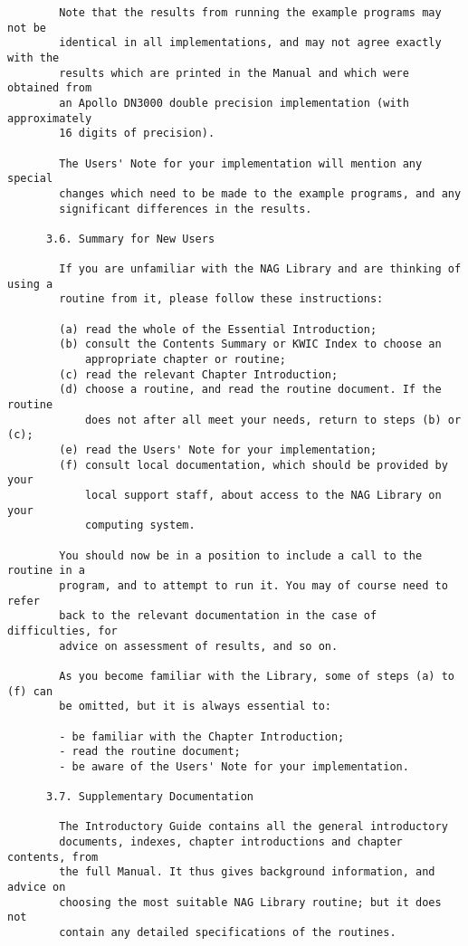 \begin{small}
\begin{verbatim}
        Note that the results from running the example programs may not be
        identical in all implementations, and may not agree exactly with the
        results which are printed in the Manual and which were obtained from
        an Apollo DN3000 double precision implementation (with approximately
        16 digits of precision).

        The Users' Note for your implementation will mention any special
        changes which need to be made to the example programs, and any
        significant differences in the results.

      3.6. Summary for New Users

        If you are unfamiliar with the NAG Library and are thinking of using a
        routine from it, please follow these instructions:

        (a) read the whole of the Essential Introduction;
        (b) consult the Contents Summary or KWIC Index to choose an
            appropriate chapter or routine;
        (c) read the relevant Chapter Introduction;
        (d) choose a routine, and read the routine document. If the routine
            does not after all meet your needs, return to steps (b) or (c);
        (e) read the Users' Note for your implementation;
        (f) consult local documentation, which should be provided by your
            local support staff, about access to the NAG Library on your
            computing system.

        You should now be in a position to include a call to the routine in a
        program, and to attempt to run it. You may of course need to refer
        back to the relevant documentation in the case of difficulties, for
        advice on assessment of results, and so on.

        As you become familiar with the Library, some of steps (a) to (f) can
        be omitted, but it is always essential to:

        - be familiar with the Chapter Introduction;
        - read the routine document;
        - be aware of the Users' Note for your implementation.

      3.7. Supplementary Documentation

        The Introductory Guide contains all the general introductory
        documents, indexes, chapter introductions and chapter contents, from
        the full Manual. It thus gives background information, and advice on
        choosing the most suitable NAG Library routine; but it does not
        contain any detailed specifications of the routines.


\end{verbatim}
\end{small}
